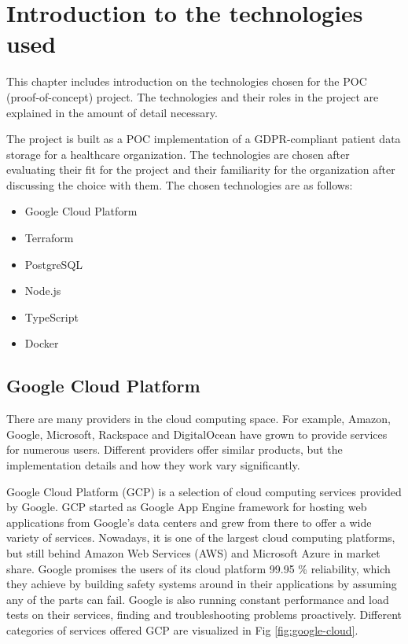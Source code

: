 \chapter{Introduction to the technologies used} \label{technologies introduction}

This chapter includes introduction on the technologies chosen for the POC (proof-of-concept) project.
The technologies and their roles in the project are explained in the amount of detail necessary.

The project is built as a POC implementation of a GDPR-compliant patient data storage for a healthcare organization.
The technologies are chosen after evaluating their fit for the project and their familiarity for the organization after discussing the choice with them. 
The chosen technologies are as follows:
\begin{itemize}
    \item Google Cloud Platform
    \item Terraform
    \item PostgreSQL
    \item Node.js
    \item TypeScript
    \item Docker
\end{itemize}

\section{Google Cloud Platform}

There are many providers in the cloud computing space.
For example, Amazon, Google, Microsoft, Rackspace and DigitalOcean have grown to provide services for numerous users.
Different providers offer similar products, but the implementation details and how they work vary significantly.
\cite{mastering-google-cloud} 

Google Cloud Platform (GCP) is a selection of cloud computing services provided by Google.
GCP started as Google App Engine framework for hosting web applications from Google's data centers and grew from there to offer a wide variety of services.
Nowadays, it is one of the largest cloud computing platforms, but still behind Amazon Web Services (AWS) and Microsoft Azure in market share.
Google promises the users of its cloud platform 99.95 \% reliability, which they achieve by building safety systems around in their applications by assuming any of the parts can fail.
Google is also running constant performance and load tests on their services, finding and troubleshooting problems proactively.
\cite{mastering-google-cloud}
Different categories of services offered GCP are visualized in Fig \ref{fig:google-cloud}.

